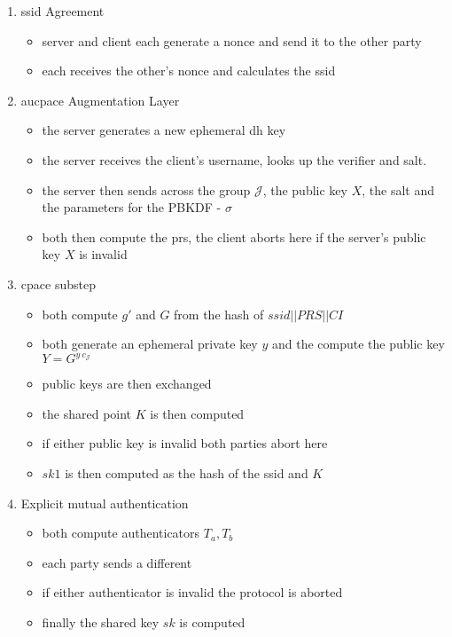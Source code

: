 \begin{enumerate}
  \item{
    \gls{ssid} Agreement
    \begin{itemize}
      \item{server and client each generate a \gls{nonce} and send it to the other party}
      \item{each receives the other's \gls{nonce} and calculates the \gls{ssid}}
    \end{itemize}
  }
  \item{
    \gls{aucpace} Augmentation Layer
    \begin{itemize}
      \item{the server generates a new ephemeral \gls{dh} key}
      \item{the server receives the client's username, looks up the verifier and salt.}
      \item{the server then sends across the group $\mathcal{J}$, the public key $X$, the salt and the parameters for the PBKDF - $\sigma$}
      \item{both then compute the \gls{prs}, the client aborts here if the server's public key $X$ is invalid}
    \end{itemize}
  }
  \item{
    \gls{cpace} substep
    \begin{itemize}
      \item{both compute $g'$ and $G$ from the hash of $ssid||PRS||CI$}
      \item{both generate an ephemeral private key $y$ and the compute the public key $Y = G^{y\ c_{\mathcal{J}}}$}
      \item{public keys are then exchanged}
      \item{the shared point $K$ is then computed}
      \item{if either public key is invalid both parties abort here}
      \item{$sk1$ is then computed as the hash of the \gls{ssid} and $K$}
    \end{itemize}
  }
  \item{
    Explicit mutual authentication
    \begin{itemize}
      \item{both compute authenticators $T_a, T_b$}
      \item{each party sends a different}
      \item{if either authenticator is invalid the protocol is aborted}
      \item{finally the shared key $sk$ is computed}
    \end{itemize}
  }
\end{enumerate}

